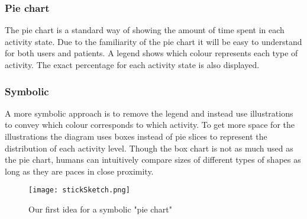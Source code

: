 \subsubsection{Pie chart}
The pie chart is a standard way of showing the amount of time spent in each activity state.%
Due to the familiarity of the pie chart it will be easy to understand for both users and patients. A legend shows which colour represents each type of activity. The exact percentage for each activity state is also displayed.

\subsubsection{Symbolic}
A more symbolic approach is to remove the legend and instead use illustrations to convey which colour corresponds to which activity. To get more space for the illustrations the diagram uses boxes instead of pie slices to represent the distribution of each activity level. Though the box chart is not as much used as the pie chart, humans can intuitively compare sizes of different types of shapes as long as they are paces in close proximity. 


\begin{figure}[h!]
	\centering
		\texttt{[image: stickSketch.png]}
		\caption{\footnotesize Our first idea for a symbolic "pie chart"}
		\label{fig:symbolicPie}
\end{figure}

